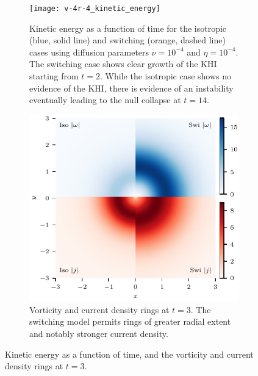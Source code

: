 \begin{figure}[t]
  \centering
    \begin{subfigure}{0.49\textwidth}
      \texttt{[image: v-4r-4\_kinetic\_energy]}
      \caption{Kinetic energy as a function of time for the isotropic (blue, solid line) and switching (orange, dashed line) cases using diffusion parameters $\nu=10^{-4}$ and $\eta=10^{-4}$. The switching case shows clear growth of the KHI starting from $t=2$. While the isotropic case shows no evidence of the KHI, there is evidence of an instability eventually leading to the null collapse at $t=14$.}
      \label{fig:v-4r-4_kinetic_energy}
    \end{subfigure}
    \hfill
    \begin{subfigure}{0.49\textwidth}
      \includegraphics[width=\linewidth]{v-4r-4_vorticity_current_ring_t_3}
      \caption{Vorticity and current density rings at $t=3$. The switching model permits rings of greater radial extent and notably stronger current density.}
      \label{fig:v-4r-4_vorticity_current_ring_t_3}
    \end{subfigure}
\caption{Kinetic energy as a function of time, and the vorticity and current density rings at $t=3$.}
\label{fig:ke_and_rings}%
\end{figure}

